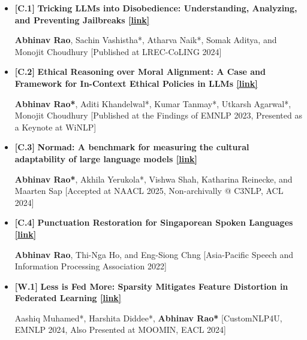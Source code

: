 \documentclass[11pt,letterpaper]{article}
\begin{document}
    \begin{itemize}[leftmargin=*,label={},itemsep=4pt]
        \item {\color{maincolor}\textbf{[C.1]}} \textbf{Tricking LLMs into Disobedience: Understanding, Analyzing,
                and Preventing Jailbreaks \href{https://aclanthology.org/2024.lrec-main.1462/}{[link]}}  
              
            \textbf{Abhinav Rao}, Sachin Vashistha*, Atharva Naik*, Somak Aditya, and Monojit Choudhury
            [Published at LREC-CoLING 2024]
        
           
        \item {\color{maincolor}\textbf{[C.2]}} \textbf{Ethical Reasoning over Moral Alignment: A Case and
                Framework for In-Context Ethical Policies in LLMs \href{https://aclanthology.org/2023.findings-emnlp.892/}{[link]}}  
              
            \textbf{Abhinav Rao*}, Aditi Khandelwal*, Kumar Tanmay*, Utkarsh Agarwal*, Monojit Choudhury
            [Published at the Findings of EMNLP 2023, Presented as a Keynote at WiNLP]
        
           
        \item {\color{maincolor}\textbf{[C.3]}} \textbf{Normad: A benchmark for measuring the cultural
                adaptability of large language models \href{https://arxiv.org/abs/2404.12464}{[link]}}  
              
            \textbf{Abhinav Rao*}, Akhila Yerukola*, Vishwa Shah, Katharina Reinecke, and Maarten Sap
            [Accepted at NAACL 2025, Non-archivally @ C3NLP, ACL 2024]
        
           
        \item {\color{maincolor}\textbf{[C.4]}} \textbf{Punctuation Restoration for Singaporean Spoken
                Languages \href{https://arxiv.org/abs/2212.05356}{[link]}}  
              
            \textbf{Abhinav Rao}, Thi-Nga Ho, and Eng-Siong Chng
            [Asia-Pacific Speech and Information Processing Association 2022]
        
           
        \item {\color{maincolor}\textbf{[W.1]}} \textbf{Less is Fed More: Sparsity Mitigates Feature Distortion in
                Federated Learning \href{https://aclanthology.org/2024.customnlp4u-1.4/}{[link]}}  
              
            Aashiq Muhamed*, Harshita Diddee*, \textbf{Abhinav Rao*}
            [CustomNLP4U, EMNLP 2024, Also Presented at MOOMIN, EACL 2024]
        

\end{itemize}
\end{document}
